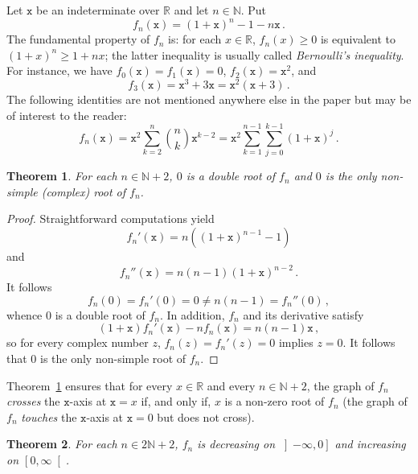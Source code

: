 \documentclass[12pt]{article}
\newcommand{\bR}{\mathbb{R}}
\newcommand{\bN}{\mathbb{N}}
\newcommand{\geint}[1]{\left[ #1, \infty \right[}
\newcommand{\leint}[1]{\left]- \infty, #1 \right]}
\newcommand{\ttx}{\mathtt{x}}
\newtheorem{theorem}{Theorem}
\begin{document}
\sloppy

Let $\ttx$ be an indeterminate over $\bR$ and let $n \in \bN$.
Put
$$
f_n(\ttx) = {(1 + \ttx)}^n - 1 - n \ttx \, .
$$
The fundamental property of $f_n$ is:
for each $x \in \bR$, $f_n(x) \ge 0$ is equivalent to ${(1 + x)}^n \ge 1 + n x$; 
the latter inequality is usually called \emph{Bernoulli's inequality}.
For instance, we have 
$f_0(\ttx) = f_1(\ttx) = 0$,
$f_2(\ttx) = \ttx^2$, and
\begin{equation} \label{eq:f3-t3}
f_3(\ttx) = \ttx^3 + 3 \ttx = \ttx^2 (\ttx + 3) \,.
\end{equation}
 The following identities are not mentioned anywhere else in the paper but may be of interest to the reader:
 $$
 f_n (\ttx)
 = \ttx^2 \sum_{k = 2}^n \binom{n}{k} \ttx^{k - 2}
 = \ttx^2 \sum_{k = 1}^{n - 1}  \sum_{j = 0}^{k - 1} {(1 + \ttx)}^j \, .  
 $$

\begin{theorem} \label{thm:root-mult}
  For each $n \in \bN + 2$,
  $0$ is a double root of $f_n$ and $0$ is the only non-simple (complex) root of $f_n$.
\end{theorem}

\begin{proof}
  Straightforward computations yield
  \begin{equation} \label{eq:deriv-fn} 
  f_n'(\ttx)  = n \left( {(1 + \ttx)}^{n - 1} -  1 \right) 
  \end{equation}
  and
  $$
  f_n''(\ttx)  = n (n - 1) {(1 + \ttx)}^{n - 2} \,.
  $$
  It follows
  $$
  f_n(0) = f_n'(0) = 0 \ne n (n - 1) = f_n''(0) \, ,
  $$
  whence $0$ is a double root of $f_n$.
  In addition, $f_n$ and its derivative satisfy 
   $$
   (1 + \ttx) f_n'(\ttx) - n f_n(\ttx) = n (n - 1) \ttx \, ,
   $$
   so for every complex number $z$, $f_n(z) = f_n'(z) = 0$ implies $z = 0$.
   It follows that $0$ is the only non-simple root of $f_n$.
 \end{proof}
 
Theorem~\ref{thm:root-mult} ensures that for every $x \in \bR$ and every $n \in \bN + 2$,
the graph of $f_n$ \emph{crosses} the $\ttx$-axis at $\ttx = x$ if, and only if, $x$ is a non-zero root of $f_n$
(the graph of $f_n$ \emph{touches} the $\ttx$-axis at $\ttx = 0$ but does not cross).



 \begin{theorem} \label{thm:variation-even}
   For each $n \in 2 \bN + 2$,
   $f_n$ is
   decreasing on $\leint{0}$ and
   increasing on $\geint{0}$.
 \end{theorem}
\end{document}
